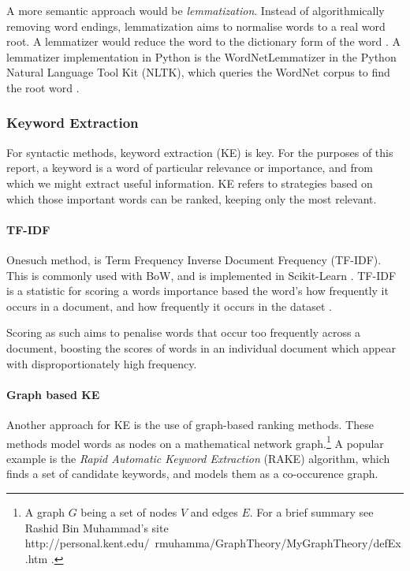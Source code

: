 A more semantic approach would be \emph{lemmatization}. Instead of algorithmically removing word endings, lemmatization 
aims to normalise words to a real word root. A lemmatizer would reduce the word to the dictionary
form of the word \cite{Jayakodi2016}.  A lemmatizer implementation in Python is the WordNetLemmatizer in the Python 
Natural Language Tool Kit (NLTK), which queries the WordNet corpus to find the root word 
\cite{StevenBirdEwanKlein2009, princetonuniversity_2010}. 
 
\subsubsection{Keyword Extraction}\label{sssec:kwe}
For syntactic methods, keyword extraction (KE) is key.  For the purposes of this report, a keyword is a word of particular
relevance or importance, and from which we might extract useful information.  KE refers to strategies
based on which those important words can be ranked, keeping only the most relevant.

\paragraph{TF-IDF}\label{ssec:tfidf}

Onesuch method, is Term Frequency Inverse Document Frequency (TF-IDF). This is commonly used with BoW, and is 
implemented in Scikit-Learn \cite{Barupal2011}.  TF-IDF is a statistic for scoring a words importance based the word's
how frequently it occurs in a document, and how frequently it occurs in the dataset \cite{Ramos2003}.

Scoring as such aims to penalise words that occur too frequently across a document, boosting the scores of words in an 
individual document which appear with disproportionately high frequency.

\paragraph{Graph based KE}\label{sssec:gbkwe}

Another approach for KE is the use of graph-based ranking methods.  These methods model words as
nodes on a mathematical network graph.\footnote{A graph $G$ being a set of nodes $V$ and edges $E$.  For a brief 
summary see Rashid Bin Muhammad's site http://personal.kent.edu/~rmuhamma/GraphTheory/MyGraphTheory/defEx.htm
\cite{muhammad}.}  A popular example is the \emph{Rapid Automatic Keyword Extraction} (RAKE) algorithm, which
finds a set of candidate keywords, and models them as a co-occurence graph.  

